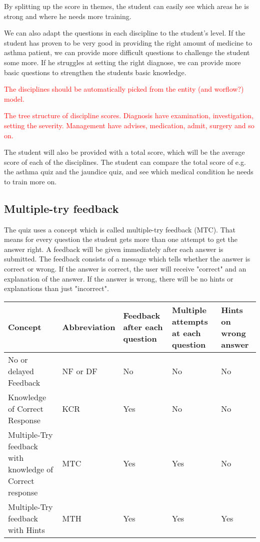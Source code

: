 By splitting up the score in themes, the student can easily see which areas he is strong and where he needs more training. 



We can also adapt the questions in each discipline to the student's level. If the student has proven to be very good in providing the right amount of medicine to asthma patient, we can provide more difficult questions to challenge the student some more. If he struggles at setting the right diagnose, we can provide more basic questions to strengthen the students basic knowledge. 

\textcolor{red}{The disciplines should be automatically picked from the entity (and worflow?) model.}

\textcolor{red}{The tree structure of discipline scores. Diagnosis have examination, investigation, setting the severity. Management have advises, medication, admit, surgery and so on.}




The student will also be provided with a total score, which will be the average score of each of the disciplines. The student can compare the total score of e.g. the asthma quiz and the jaundice quiz, and see which medical condition he needs to train more on.

\subsection{Multiple-try feedback}
The quiz uses a concept which is called multiple-try feedback (MTC). That means for every question the student gets more than one attempt to get the answer right. A feedback will be given immediately after each answer is submitted. The feedback consists of a message which tells whether the answer is correct or wrong. If the answer is correct, the user will receive "correct" and an explanation of the answer. If the answer is wrong, there will be no hints or explanations than just "incorrect".

\begin{tabular}{ | m{10em} | m{6em}| m{6em} | m{6em} | m{5em} | } 
	\hline
	Concept & Abbreviation & Feedback after each question & Multiple attempts at each question & Hints on wrong answer \\ [0.5ex]
	\hline
No or delayed Feedback & NF or DF & No & No & No  \\
Knowledge of Correct Response & KCR  & Yes & No & No \\
Multiple-Try feedback with knowledge of Correct response  & MTC & Yes & Yes & No \\
Multiple-Try feedback with Hints & MTH & Yes & Yes & Yes \\
\hline
\end{tabular}

